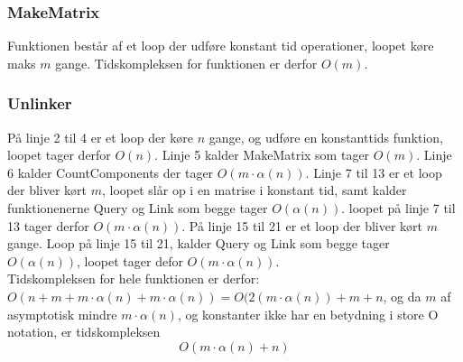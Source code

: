 \documentclass[12pt]{article}
\begin{document}
\subsubsection*{MakeMatrix}
Funktionen består af et loop der udføre konstant tid operationer, loopet køre maks $m$ gange. Tidskompleksen for funktionen er derfor $O(m)$.
\subsubsection*{Unlinker}
På linje 2 til 4 er et loop der køre $n$ gange, og udføre en konstanttids funktion, loopet tager derfor $O(n)$. Linje 5 kalder MakeMatrix som tager $O(m)$. Linje 6 kalder CountComponents der tager $O(m\cdot\alpha(n))$. Linje 7 til 13 er et loop der bliver kørt $m$, loopet slår op i en matrise i konstant tid, samt kalder funktionenerne Query og Link som begge tager $O(\alpha(n))$. loopet på linje 7 til 13 tager derfor $O(m\cdot\alpha(n))$. På linje 15 til 21 er et loop der bliver kørt $m$ gange. Loop på linje 15 til 21, kalder Query og Link som begge tager $O(\alpha(n))$, loopet tager defor $O(m\cdot\alpha(n))$.\\
Tidskompleksen for hele funktionen er derfor: $O(n+m+m\cdot\alpha(n)+m\cdot\alpha(n)) = O(2(m\cdot\alpha(n))+m+n$, og da $m$ af asymptotisk mindre $m\cdot\alpha(n)$, og konstanter ikke har en betydning i store O notation, er tidskompleksen $$O(m\cdot\alpha(n)+n)$$
\end{document}
